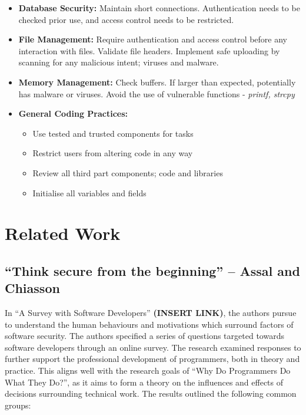 \begin{itemize}
\item \textbf{Database Security:} Maintain short connections. Authentication needs to be checked prior use, and access control needs to be restricted. 
\item \textbf{File Management:} Require authentication and access control before any interaction with files. Validate file headers. Implement safe uploading by scanning for any malicious intent; viruses and malware. 
\item \textbf{Memory Management:} Check buffers. If larger than expected, potentially has malware or viruses. Avoid the use of vulnerable functions - \textit{printf, strcpy}
\item \textbf{General Coding Practices:}
\begin{itemize}
\item Use tested and trusted components for tasks
\item Restrict users from altering code in any way
\item Review all third part components; code and libraries
\item Initialise all variables and fields
\end{itemize}
\end{itemize}

\section{Related Work}

\subsection{“Think secure from the beginning” – Assal and Chiasson}

In “A Survey with Software Developers” \textbf{(INSERT LINK)}, the authors pursue to understand the human behaviours and motivations which surround factors of software security. The authors specified a series of questions targeted towards software developers through an online survey. The research examined responses to further support the professional development of programmers, both in theory and practice. This aligns well with the research goals of “Why Do Programmers Do What They Do?”, as it aims to form a theory on the influences and effects of decisions surrounding technical work. 
\newline
\newline
The results outlined the following common groups:


